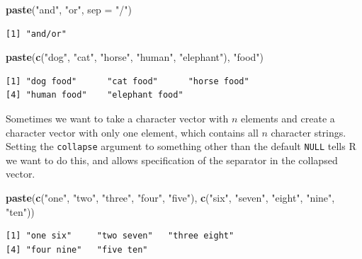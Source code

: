 \documentclass[
]{krantz}
\makeatletter
\newenvironment{Shaded}{\begin{snugshade}}{\end{snugshade}}
\newcommand{\DataTypeTok}[1]{\textcolor[rgb]{0.27,0.27,0.27}{#1}}
\newcommand{\KeywordTok}[1]{\textcolor[rgb]{0.27,0.27,0.27}{\textbf{#1}}}
\newcommand{\NormalTok}[1]{#1}
\newcommand{\StringTok}[1]{\textcolor[rgb]{0.5,0.5,0.5}{#1}}
\newenvironment{kframe}{%
\medskip{}
\setlength{\fboxsep}{.8em}
 \def\at@end@of@kframe{}%
 \ifinner\ifhmode%
  \def\at@end@of@kframe{\end{minipage}}%
  \begin{minipage}{\columnwidth}%
 \fi\fi%
 \def\FrameCommand##1{\hskip\@totalleftmargin \hskip-\fboxsep
 \colorbox{shadecolor}{##1}\hskip-\fboxsep
     \hskip-\linewidth \hskip-\@totalleftmargin \hskip\columnwidth}%
 \MakeFramed {\advance\hsize-\width
   \@totalleftmargin\z@ \linewidth\hsize
   \@setminipage}}%
 {\par\unskip\endMakeFramed%
 \at@end@of@kframe}
\renewenvironment{Shaded}{\begin{kframe}}{\end{kframe}}
\makeatother
\begin{document}
\begin{Shaded}
\begin{Highlighting}[]
\KeywordTok{paste}\NormalTok{(}\StringTok{"and"}\NormalTok{, }\StringTok{"or"}\NormalTok{, }\DataTypeTok{sep =} \StringTok{"/"}\NormalTok{)}
\end{Highlighting}
\end{Shaded}

\begin{verbatim}
[1] "and/or"
\end{verbatim}

\begin{Shaded}
\begin{Highlighting}[]
\KeywordTok{paste}\NormalTok{(}\KeywordTok{c}\NormalTok{(}\StringTok{"dog"}\NormalTok{, }\StringTok{"cat"}\NormalTok{, }\StringTok{"horse"}\NormalTok{, }\StringTok{"human"}\NormalTok{, }\StringTok{"elephant"}\NormalTok{), }\StringTok{"food"}\NormalTok{)}
\end{Highlighting}
\end{Shaded}

\begin{verbatim}
[1] "dog food"      "cat food"      "horse food"   
[4] "human food"    "elephant food"
\end{verbatim}

Sometimes we want to take a character vector with \(n\) elements and create a character vector with only one element, which contains all \(n\) character strings. Setting the \texttt{collapse} argument to something other than the default \texttt{NULL} tells R we want to do this, and allows specification of the separator in the collapsed vector.

\begin{Shaded}
\begin{Highlighting}[]
\KeywordTok{paste}\NormalTok{(}\KeywordTok{c}\NormalTok{(}\StringTok{"one"}\NormalTok{, }\StringTok{"two"}\NormalTok{, }\StringTok{"three"}\NormalTok{, }\StringTok{"four"}\NormalTok{, }\StringTok{"five"}\NormalTok{), }
      \KeywordTok{c}\NormalTok{(}\StringTok{"six"}\NormalTok{, }\StringTok{"seven"}\NormalTok{, }\StringTok{"eight"}\NormalTok{, }\StringTok{"nine"}\NormalTok{, }\StringTok{"ten"}\NormalTok{))}
\end{Highlighting}
\end{Shaded}

\begin{verbatim}
[1] "one six"     "two seven"   "three eight"
[4] "four nine"   "five ten"   
\end{verbatim}
\end{document}
